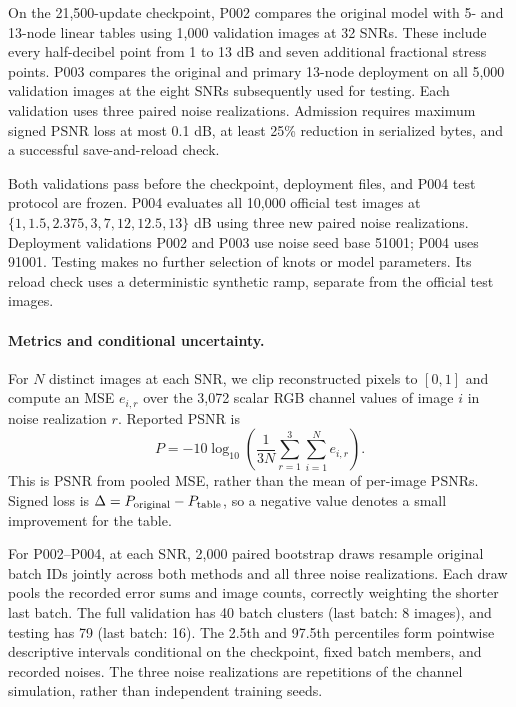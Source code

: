 On the 21,500-update checkpoint, P002 compares the original model with 5- and 13-node linear tables using 1,000 validation images at 32 SNRs. These include every half-decibel point from 1 to 13 dB and seven additional fractional stress points. P003 compares the original and primary 13-node deployment on all 5,000 validation images at the eight SNRs subsequently used for testing. Each validation uses three paired noise realizations. Admission requires maximum signed PSNR loss at most 0.1 dB, at least 25\% reduction in serialized bytes, and a successful save-and-reload check.

Both validations pass before the checkpoint, deployment files, and P004 test protocol are frozen. P004 evaluates all 10,000 official test images at $\{1,1.5,2.375,3,7,12,12.5,13\}$ dB using three new paired noise realizations. Deployment validations P002 and P003 use noise seed base 51001; P004 uses 91001. Testing makes no further selection of knots or model parameters. Its reload check uses a deterministic synthetic ramp, separate from the official test images.

\paragraph{Metrics and conditional uncertainty.}
For $N$ distinct images at each SNR, we clip reconstructed pixels to $[0,1]$ and compute an MSE $e_{i,r}$ over the 3,072 scalar RGB channel values of image $i$ in noise realization $r$. Reported PSNR is
\begin{equation}
 P=-10\log_{10}\!\left(\frac{1}{3N}\sum_{r=1}^{3}\sum_{i=1}^{N} e_{i,r}\right).
\end{equation}
This is PSNR from pooled MSE, rather than the mean of per-image PSNRs. Signed loss is $\Delta=P_{\rm original}-P_{\rm table}$, so a negative value denotes a small improvement for the table.

For P002--P004, at each SNR, 2,000 paired bootstrap draws resample original batch IDs jointly across both methods and all three noise realizations. Each draw pools the recorded error sums and image counts, correctly weighting the shorter last batch. The full validation has 40 batch clusters (last batch: 8 images), and testing has 79 (last batch: 16). The 2.5th and 97.5th percentiles form pointwise descriptive intervals conditional on the checkpoint, fixed batch members, and recorded noises. The three noise realizations are repetitions of the channel simulation, rather than independent training seeds.
